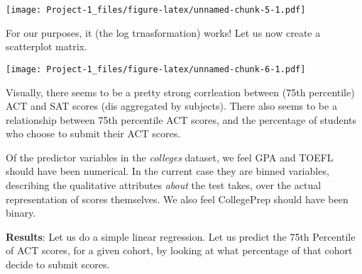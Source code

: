 \documentclass[
]{article}
\newenvironment{Shaded}{\begin{snugshade}}{\end{snugshade}}
\newcommand{\AttributeTok}[1]{\textcolor[rgb]{0.77,0.63,0.00}{#1}}
\newcommand{\FunctionTok}[1]{\textcolor[rgb]{0.00,0.00,0.00}{#1}}
\newcommand{\NormalTok}[1]{#1}
\newcommand{\OtherTok}[1]{\textcolor[rgb]{0.56,0.35,0.01}{#1}}
\newcommand{\SpecialCharTok}[1]{\textcolor[rgb]{0.00,0.00,0.00}{#1}}
\begin{document}
\texttt{[image: Project-1\_files/figure-latex/unnamed-chunk-5-1.pdf]}

For our purposes, it (the log trnasformation) works! Let us now create a
scatterplot matrix.

\begin{Shaded}
\end{Shaded}

\texttt{[image: Project-1\_files/figure-latex/unnamed-chunk-6-1.pdf]}

Visually, there seems to be a pretty strong corrleation between (75th
percentile) ACT and SAT scores (dis aggregated by subjects). There also
seems to be a relationship between 75th percentile ACT scores, and the
percentage of students who choose to submit their ACT scores.

Of the predictor variables in the \emph{colleges} dataset, we feel GPA
and TOEFL should have been numerical. In the current case they are
binned variables, describing the qualitative attributes \emph{about} the
test takes, over the actual representation of scores themselves. We also
feel CollegePrep should have been binary.

\textbf{Results}: Let us do a simple linear regression. Let us predict
the 75th Percentile of ACT scores, for a given cohort, by looking at
what percentage of that cohort decide to submit scores.

\begin{Shaded}
\end{Shaded}
\end{document}
